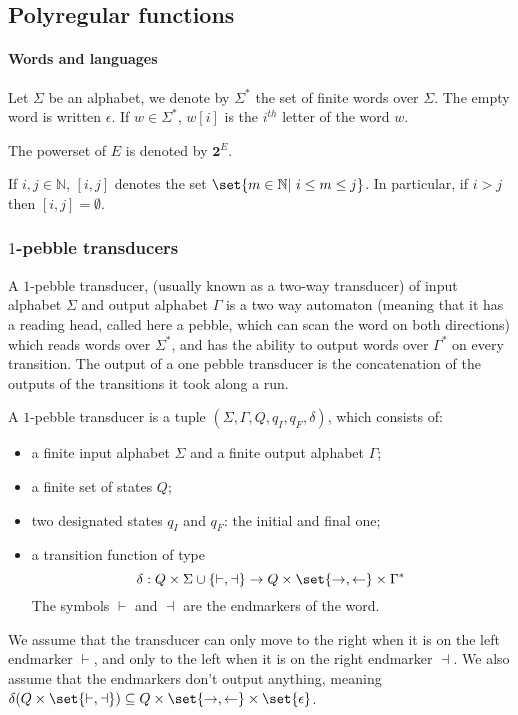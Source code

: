 \subsection{Polyregular functions}

\paragraph{Words and languages}  
Let $\Sigma$ be an alphabet, we denote by $\Sigma^*$
 the set of finite words over $\Sigma$. The empty word is written $\epsilon$. If $w\in \Sigma^*$, $w[i]$ is the $i^{th}$ letter of the word $w$.

The powerset of $E$ is denoted by $\mathbf 2^E$.

If $i, j \in \mathbb{N}$, $[i,j]$ denotes the set $\set{m \in \mathbb{N} |\ i\leq m\leq j}$. In particular, if $ i>j$ then $[i,j]=\emptyset$. 

\subsubsection{$1$-pebble transducers}
A $1$-pebble transducer, (usually known as a two-way transducer) of input alphabet $\Sigma$ and output alphabet $\Gamma$ is a two way automaton (meaning that it has a reading head, called here a pebble, which can scan the word on both directions) which reads words over $\Sigma^*$, and has the ability to output words over $\Gamma^*$ on every transition. 
The output of a one pebble transducer is the concatenation of the outputs of the transitions it took along a run.

\begin{definition}\label{def:1pebble}
A $1$-pebble transducer is a tuple $(\Sigma,\Gamma, Q, q_I, q_F, \delta)$, which consists of:
\begin{itemize}
\item a finite input alphabet $\Sigma$ and a finite output alphabet $\Gamma$; 
\item a finite set of states $Q$;
\item two designated states $q_I$ and $q_F$: the initial and final one;
\item  a transition function of type 
$$\delta : Q\times \Sigma\cup\{\vdash,\dashv\} \to Q\times\set{\rightarrow,\leftarrow}\times\Gamma^*$$
The symbols  $\vdash$ and $\dashv$ are the endmarkers of the word. 
\end{itemize}
We assume that the transducer can only move to the right when it is on the left endmarker $\vdash$, and only to the left when  it is on the right endmarker $\dashv$. We also assume that the endmarkers don't output anything, meaning  $\delta(Q\times\set{\vdash,\dashv})\subseteq Q\times\set{\rightarrow,\leftarrow}\times \set{\epsilon}$.
 \end{definition}


